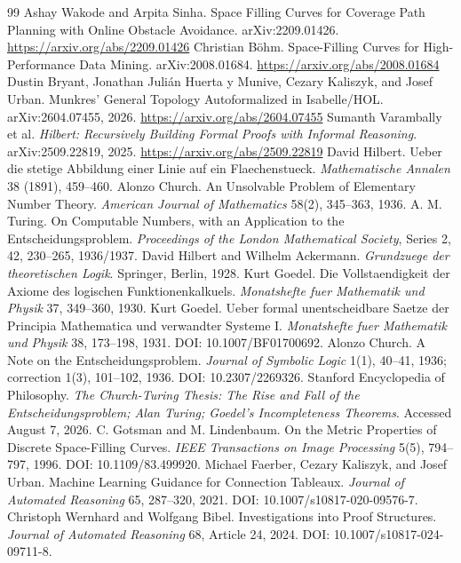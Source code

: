 \documentclass[11pt]{article}
\theoremstyle{hilberttheorem}
\begin{document}
\begin{thebibliography}{99}
 Ashay Wakode and Arpita Sinha. Space Filling Curves for Coverage Path Planning with Online Obstacle Avoidance. arXiv:2209.01426. \url{https://arxiv.org/abs/2209.01426}
 Christian B\"ohm. Space-Filling Curves for High-Performance Data Mining. arXiv:2008.01684. \url{https://arxiv.org/abs/2008.01684}
 Dustin Bryant, Jonathan Juli\'an Huerta y Munive, Cezary Kaliszyk, and Josef Urban. Munkres' General Topology Autoformalized in Isabelle/HOL. arXiv:2604.07455, 2026. \url{https://arxiv.org/abs/2604.07455}
 Sumanth Varambally et al. \emph{Hilbert: Recursively Building Formal Proofs with Informal Reasoning}. arXiv:2509.22819, 2025. \url{https://arxiv.org/abs/2509.22819}
 David Hilbert. Ueber die stetige Abbildung einer Linie auf ein Flaechenstueck. \emph{Mathematische Annalen} 38 (1891), 459--460.
 Alonzo Church. An Unsolvable Problem of Elementary Number Theory. \emph{American Journal of Mathematics} 58(2), 345--363, 1936.
 A. M. Turing. On Computable Numbers, with an Application to the Entscheidungsproblem. \emph{Proceedings of the London Mathematical Society}, Series 2, 42, 230--265, 1936/1937.
 David Hilbert and Wilhelm Ackermann. \emph{Grundzuege der theoretischen Logik}. Springer, Berlin, 1928.
 Kurt Goedel. Die Vollstaendigkeit der Axiome des logischen Funktionenkalkuels. \emph{Monatshefte fuer Mathematik und Physik} 37, 349--360, 1930.
 Kurt Goedel. Ueber formal unentscheidbare Saetze der Principia Mathematica und verwandter Systeme I. \emph{Monatshefte fuer Mathematik und Physik} 38, 173--198, 1931. DOI: 10.1007/BF01700692.
 Alonzo Church. A Note on the Entscheidungsproblem. \emph{Journal of Symbolic Logic} 1(1), 40--41, 1936; correction 1(3), 101--102, 1936. DOI: 10.2307/2269326.
 Stanford Encyclopedia of Philosophy. \emph{The Church-Turing Thesis: The Rise and Fall of the Entscheidungsproblem; Alan Turing; Goedel's Incompleteness Theorems}. Accessed August 7, 2026.
 C. Gotsman and M. Lindenbaum. On the Metric Properties of Discrete Space-Filling Curves. \emph{IEEE Transactions on Image Processing} 5(5), 794--797, 1996. DOI: 10.1109/83.499920.
 Michael Faerber, Cezary Kaliszyk, and Josef Urban. Machine Learning Guidance for Connection Tableaux. \emph{Journal of Automated Reasoning} 65, 287--320, 2021. DOI: 10.1007/s10817-020-09576-7.
 Christoph Wernhard and Wolfgang Bibel. Investigations into Proof Structures. \emph{Journal of Automated Reasoning} 68, Article 24, 2024. DOI: 10.1007/s10817-024-09711-8.

\end{thebibliography}
\end{document}
